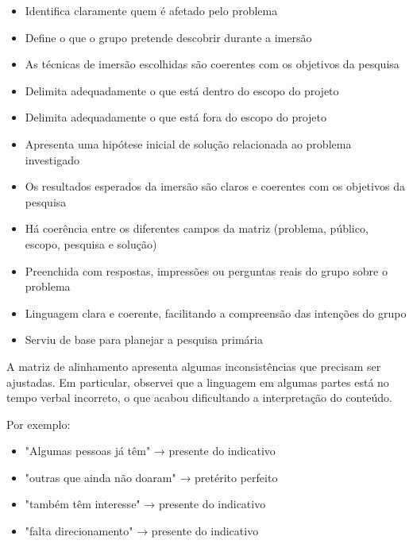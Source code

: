\documentclass[
  sigconf,
  nonacm, %
  language=portuguese
]{acmart}
\begin{document}
\begin{itemize}[leftmargin=14pt,itemsep=1pt,topsep=3pt,parsep=0pt]
  \item[\textcolor{cgood}{$\checkmark$}] {\small\textcolor{cgood}{Identifica claramente quem é afetado pelo problema}}
  \item[\textcolor{cgood}{$\checkmark$}] {\small\textcolor{cgood}{Define o que o grupo pretende descobrir durante a imersão}}
  \item[\textcolor{cgood}{$\checkmark$}] {\small\textcolor{cgood}{As técnicas de imersão escolhidas são coerentes com os objetivos da pesquisa}}
  \item[\textcolor{cgood}{$\checkmark$}] {\small\textcolor{cgood}{Delimita adequadamente o que está dentro do escopo do projeto}}
  \item[$\square$] {\small\textcolor{cmuted}{Delimita adequadamente o que está fora do escopo do projeto}}
  \item[\textcolor{cgood}{$\checkmark$}] {\small\textcolor{cgood}{Apresenta uma hipótese inicial de solução relacionada ao problema investigado}}
  \item[$\square$] {\small\textcolor{cmuted}{Os resultados esperados da imersão são claros e coerentes com os objetivos da pesquisa}}
  \item[\textcolor{cgood}{$\checkmark$}] {\small\textcolor{cgood}{Há coerência entre os diferentes campos da matriz (problema, público, escopo, pesquisa e solução)}}
  \item[\textcolor{cgood}{$\checkmark$}] {\small\textcolor{cgood}{Preenchida com respostas, impressões ou perguntas reais do grupo sobre o problema}}
  \item[$\square$] {\small\textcolor{cmuted}{Linguagem clara e coerente, facilitando a compreensão das intenções do grupo}}
  \item[\textcolor{cgood}{$\checkmark$}] {\small\textcolor{cgood}{Serviu de base para planejar a pesquisa primária}}
\end{itemize}

A matriz de alinhamento apresenta algumas inconsistências que precisam ser ajustadas. Em particular, observei que a linguagem em algumas partes está no tempo verbal incorreto, o que acabou dificultando a interpretação do conteúdo.

Por exemplo:

\begin{itemize}[leftmargin=14pt,itemsep=2pt,topsep=4pt]
  \item "Algumas pessoas já têm" → presente do indicativo 
  \item "outras que ainda não doaram" → pretérito perfeito 
  \item "também têm interesse" → presente do indicativo 
  \item "falta direcionamento" → presente do indicativo 
\end{itemize}
\end{document}
